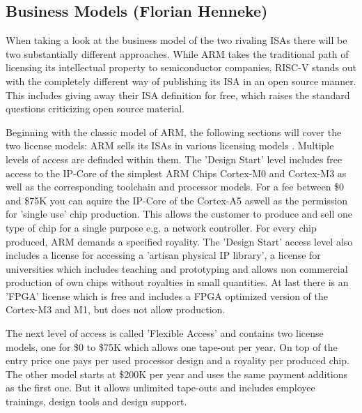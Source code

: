 \documentclass[conference]{IEEEtran}
\begin{document}
	\subsection{Business Models (Florian Henneke)}
	\label{businessModels}
	When taking a look at the business model of the two rivaling \glspl{ISA} there will be two substantially different approaches. While ARM takes the traditional path of licensing its intellectual property to semiconductor companies, RISC-V stands out with the completely different way of publishing its \gls{ISA} in an open source manner. This includes giving away their \gls{ISA} definition for free, which raises the standard questions criticizing open source material. %

	Beginning with the classic model of ARM, the following sections will cover the two license models: ARM sells its \glspl{ISA} in various licensing models \cite{ARMLC}. Multiple levels of access are definded within them. The 'Design Start' level includes free access to the IP-Core of the simplest ARM Chips Cortex-M0 and Cortex-M3 as well as the corresponding toolchain and processor models. For a fee between \$0 and \$75K \cite{ARMLC} you can aquire the IP-Core of the Cortex-A5 aswell as the permission for 'single use' chip production. This allows the customer to produce and sell one type of chip for a single purpose e.g. a network controller. For every chip produced, ARM demands a specified royality. The 'Design Start' access level also includes a license for accessing a 'artisan physical IP library', a license for universities which includes teaching and prototyping and allows non commercial production of own chips without royalties in small quantities. At last there is an '\acrshort{FPGA}' license which is free and includes a \gls{FPGA} optimized version of the Cortex-M3 and M1, but does not allow production.

	The next level of access is called 'Flexible Access' and contains two license models, one for \$0 to \$75K which allows one tape-out per year. On top of the entry price one pays per used processor design and a royality per produced chip. The other model starts at \$200K per year and uses the same payment additions as the first one. But it allows unlimited tape-outs and includes employee trainings, design tools and design support. \cite{ARMLC}
\end{document}
